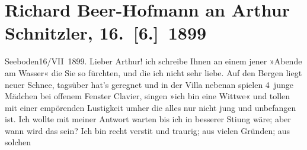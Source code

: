 

         
         \renewcommand{\erwaehntePersonen}{Personen: Hermann Beer, Richard Beer-Hofmann, Ernst Fuchs, Paul Goldmann, Hugo von Hofmannsthal, Oskar Mayer, Gustav Schwarzkopf}
         \renewcommand{\erwaehnteOrte}{Orte: Frankfurt am Main, Seeboden, Wien}
         \renewcommand{\erwaehnteWerke}{Werke: Die kleine Witwe}
               \section[Richard Beer-Hofmann an Arthur Schnitzler, 16. {[}6.{]} 1899]{ Richard Beer-Hofmann an Arthur Schnitzler, 16. {[}6.{]} 1899}\nopagebreak{}\rehead{ }\begin{ledgroupsized}[t]{13cm}\normalsize\beginnumbering{} \toendnotes[C]{\smallbreak\pagebreak[2]} 
\toendnotes[C]{\smallbreak}\pstart
           \raggedleft{}{\pb}Seeboden16/VII 1899.\pend
           \pstart
           Lieber Arthur! ich schreibe Ihnen an einem jener »Abende am Wasser«
               die Sie so fürchten, und die ich nicht sehr liebe. Auf den Bergen liegt neuer Schnee,
               tagsüber hat’s geregnet und in der Villa nebenan spielen 4 junge Mäd{\pb}chen bei offenem Fenster Clavier,
               singen »ich bin eine Wittwe« und tollen mit
               einer empörenden Lustigkeit umher die alles nur nicht jung und unbefangen ist.\pend
           \pstart
           Ich wollte mit meiner Antwort warten bis ich in besserer Sti{\geminationm}ung wäre; aber wann {\pb}wird das sein? Ich bin recht
                  versti{\geminationm}t und traurig; aus vielen Gründen; aus solchen

\end{ledgroupsized}
